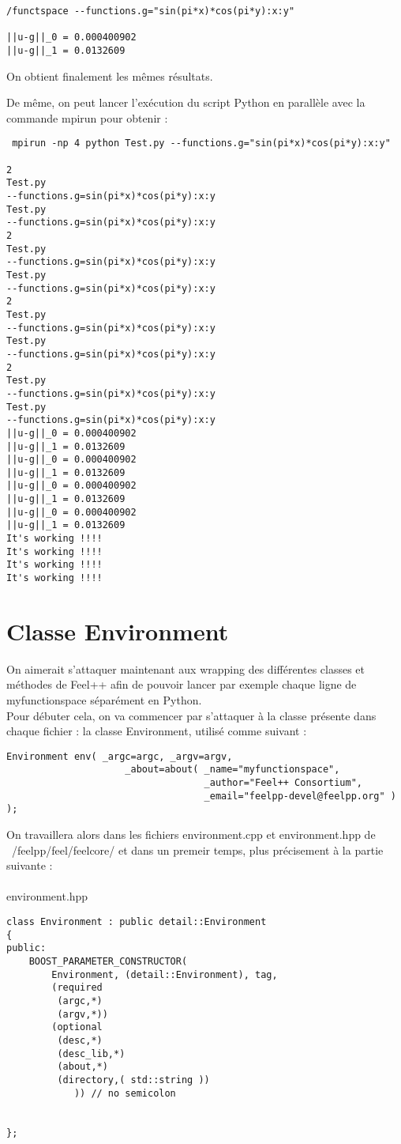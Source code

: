 \documentclass[12pt]{article}
\begin{document}
\begin{verbatim}
/functspace --functions.g="sin(pi*x)*cos(pi*y):x:y"

||u-g||_0 = 0.000400902
||u-g||_1 = 0.0132609
\end{verbatim}

On obtient finalement les mêmes résultats.

De même, on peut lancer l'exécution du script Python en parallèle avec la commande mpirun pour obtenir :

\begin{verbatim}
 mpirun -np 4 python Test.py --functions.g="sin(pi*x)*cos(pi*y):x:y"

2
Test.py
--functions.g=sin(pi*x)*cos(pi*y):x:y
Test.py
--functions.g=sin(pi*x)*cos(pi*y):x:y
2
Test.py
--functions.g=sin(pi*x)*cos(pi*y):x:y
Test.py
--functions.g=sin(pi*x)*cos(pi*y):x:y
2
Test.py
--functions.g=sin(pi*x)*cos(pi*y):x:y
Test.py
--functions.g=sin(pi*x)*cos(pi*y):x:y
2
Test.py
--functions.g=sin(pi*x)*cos(pi*y):x:y
Test.py
--functions.g=sin(pi*x)*cos(pi*y):x:y
||u-g||_0 = 0.000400902
||u-g||_1 = 0.0132609
||u-g||_0 = 0.000400902
||u-g||_1 = 0.0132609
||u-g||_0 = 0.000400902
||u-g||_1 = 0.0132609
||u-g||_0 = 0.000400902
||u-g||_1 = 0.0132609
It's working !!!!
It's working !!!!
It's working !!!!
It's working !!!!
\end{verbatim}

\section{Classe Environment}

On aimerait s'attaquer maintenant aux wrapping des différentes classes et méthodes de Feel++ afin de pouvoir lancer par exemple chaque ligne de myfunctionspace séparément en Python.\\

Pour débuter cela, on va commencer par s'attaquer à la classe présente dans chaque fichier : la classe Environment, utilisé comme suivant :

\begin{lstlisting}
Environment env( _argc=argc, _argv=argv,
                     _about=about( _name="myfunctionspace",
                                   _author="Feel++ Consortium",
                                   _email="feelpp-devel@feelpp.org" )  );

\end{lstlisting}

On travaillera alors dans les fichiers environment.cpp et environment.hpp de ~/feelpp/feel/feelcore/ et dans un premeir temps, plus précisement à la partie suivante : \\
\\
environment.hpp
\begin{lstlisting}
class Environment : public detail::Environment
{
public:
    BOOST_PARAMETER_CONSTRUCTOR(
        Environment, (detail::Environment), tag,
        (required
         (argc,*)
         (argv,*))
        (optional
         (desc,*)
         (desc_lib,*)
         (about,*)
         (directory,( std::string ))
            )) // no semicolon
     
      
};
\end{lstlisting}
\end{document}
